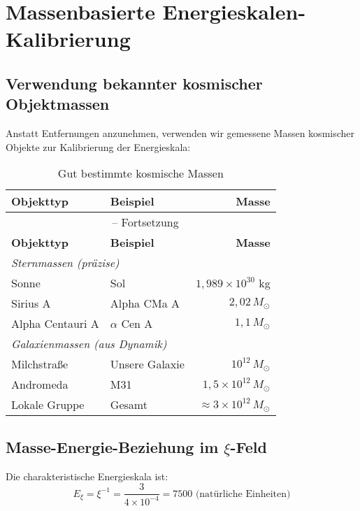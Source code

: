 \documentclass[12pt,a4paper]{article}
\newcommand{\Exi}{E_\xi}
\theoremstyle{definition}
\begin{document}
	\section{Massenbasierte Energieskalen-Kalibrierung}
	
	\subsection{Verwendung bekannter kosmischer Objektmassen}
	
	Anstatt Entfernungen anzunehmen, verwenden wir gemessene Massen kosmischer Objekte zur Kalibrierung der Energieskala:
	
	\begin{longtable}{l l r}
		\caption{Gut bestimmte kosmische Massen} \\
		\toprule
		\textbf{Objekttyp} & \textbf{Beispiel} & \textbf{Masse} \\
		\midrule
		\endfirsthead
		\multicolumn{3}{c}{\tablename\ \thetable{} -- Fortsetzung} \\
		\toprule
		\textbf{Objekttyp} & \textbf{Beispiel} & \textbf{Masse} \\
		\midrule
		\endhead
		\multicolumn{3}{l}{\emph{Sternmassen (pr\"azise)}} \\
		Sonne & Sol & $1,989 \times 10^{30}$ kg \\
		Sirius A & Alpha CMa A & $2,02\,M_\odot$ \\
		Alpha Centauri A & $\alpha$ Cen A & $1,1\,M_\odot$ \\
		\midrule
		\multicolumn{3}{l}{\emph{Galaxienmassen (aus Dynamik)}} \\
		Milchstra\ss{}e & Unsere Galaxie & $10^{12}\,M_\odot$ \\
		Andromeda & M31 & $1,5 \times 10^{12}\,M_\odot$ \\
		Lokale Gruppe & Gesamt & $\approx 3 \times 10^{12}\,M_\odot$ \\
		\bottomrule
	\end{longtable}
	
	\subsection{Masse-Energie-Beziehung im $\xi$-Feld}
	
	Die charakteristische Energieskala ist:
	\begin{equation}
		\Exi = \xi^{-1} = \frac{3}{4 \times 10^{-4}} = 7500 \text{ (nat\"urliche Einheiten)}
	\end{equation}
	
\end{document}
